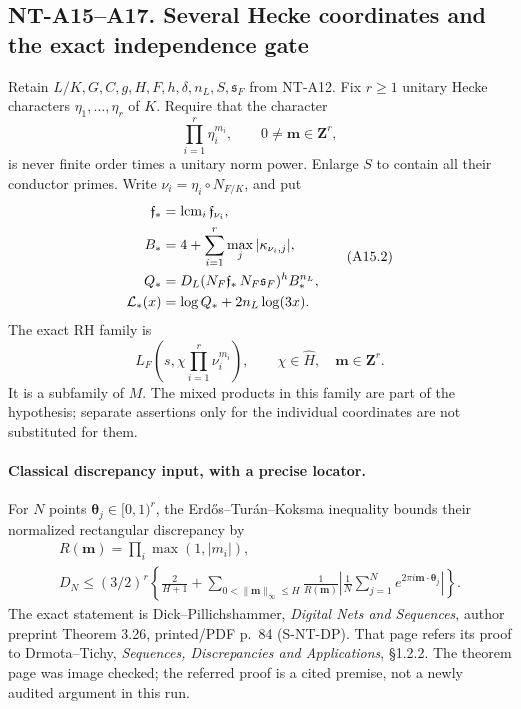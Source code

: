 \subsection*{NT-A15--A17. Several Hecke coordinates and the exact independence gate}

Retain \(L/K,G,C,g,H,F,h,\delta,n_L,S,\mathfrak s_F\)
from NT-A12. Fix \(r\ge1\) unitary Hecke characters
\(\eta_1,\ldots,\eta_r\) of \(K\). Require that the character
\[
             \prod_{i=1}^r\eta_i^{m_i},
                    \qquad 0\ne\mathbf m\in\mathbf Z^r,  \tag{A15.1}
\]
is never finite order times a unitary norm power.
Enlarge \(S\) to contain all their conductor primes.
Write \(\nu_i=\eta_i\circ N_{F/K}\), and put
\[
 \begin{aligned}
 \mathfrak f_*&=\operatorname{lcm}_i\mathfrak f_{\nu_i},\\
 B_*&=4+\sum_{i=1}^r\max_j|\kappa_{\nu_i,j}|,\\
 Q_*&=D_L(N_F\mathfrak f_*\,N_F\mathfrak s_F)^h B_*^{n_L},\\
 {\cal L}_*(x)&=\log Q_*+2n_L\log(3x).
 \end{aligned}                                             \tag{A15.2}
\]
The exact RH family is
\[
 L_F\left(s,\chi\prod_{i=1}^r\nu_i^{m_i}\right),
       \qquad \chi\in\widehat H,\quad\mathbf m\in\mathbf Z^r .
                                                               \tag{A15.3}
\]
It is a subfamily of \(M\). The mixed products in this family
are part of the hypothesis; separate assertions only for
the individual coordinates are not substituted for them.

\paragraph{Classical discrepancy input, with a precise locator.}
For \(N\) points \(\boldsymbol\theta_j\in[0,1)^r\), the
Erd\H{o}s--Tur\'an--Koksma inequality bounds their normalized
rectangular discrepancy by
\[
 \begin{gathered}
 R(\mathbf m)=\prod_i\max(1,|m_i|),\\
 D_N\le(3/2)^r\left\{\frac2{H+1}
     +\sum_{0<\|\mathbf m\|_\infty\le H}
       \frac{1}{R(\mathbf m)}
       \left|\frac1N\sum_{j=1}^N
                  e^{2\pi i\mathbf m\cdot\boldsymbol\theta_j}
       \right|\right\}.
 \end{gathered}                                             \tag{A15.4}
\]
The exact statement is Dick--Pillichshammer,
\emph{Digital Nets and Sequences}, author preprint
Theorem 3.26, printed/PDF p.~84 (S-NT-DP).
That page refers its proof to Drmota--Tichy,
\emph{Sequences, Discrepancies and Applications},
\S1.2.2. The theorem page was image checked; the
referred proof is a cited premise, not a newly audited
argument in this run.

